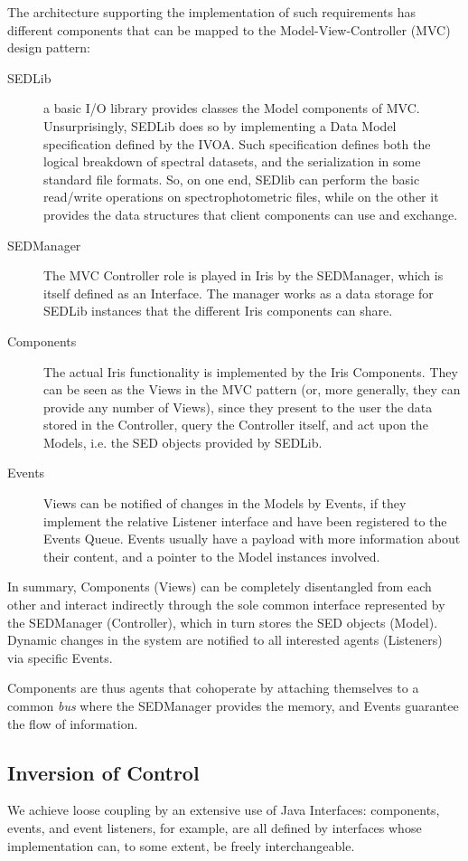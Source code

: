 \documentclass[preprint,12pt,3p]{elsarticle}
\begin{document}
The architecture supporting the implementation of such requirements has different components that can be mapped to the Model-View-Controller (MVC) design pattern:
\begin{description}
\item[SEDLib] a basic I/O library provides classes the Model components of MVC. Unsurprisingly, SEDLib does so by implementing a Data Model specification defined by the IVOA. Such specification defines both the logical breakdown of spectral datasets, and the serialization in some standard file formats. So, on one end, SEDlib can perform the basic read/write operations on spectrophotometric files, while on the other it provides the data structures that client components can use and exchange.
\item[SEDManager] The MVC Controller role is played in Iris by the SEDManager, which is itself defined as an Interface. The manager works as a data storage for SEDLib instances that the different Iris components can share.
\item[Components] The actual Iris functionality is implemented by the Iris Components. They can be seen as the Views in the MVC pattern (or, more generally, they can provide any number of Views), since they present to the user the data stored in the Controller, query the Controller itself, and act upon the Models, i.e. the SED objects provided by SEDLib.
\item[Events] Views can be notified of changes in the Models by Events, if they implement the relative Listener interface and have been registered to the Events Queue. Events usually have a payload with more information about their content, and a pointer to the Model instances involved.
\end{description}

In summary, Components (Views) can be completely disentangled from each other and interact indirectly through the sole common interface represented by the SEDManager (Controller), which in turn stores the SED objects (Model). Dynamic changes in the system are notified to all interested agents (Listeners) via specific Events.

Components are thus agents that cohoperate by attaching themselves to a common \emph{bus} where the SEDManager provides the memory, and Events guarantee the flow of information.

\subsection{Inversion of Control}
We achieve loose coupling by an extensive use of Java Interfaces: components, events, and event listeners, for example, are all defined by interfaces whose implementation can, to some extent, be freely interchangeable.
\end{document}
